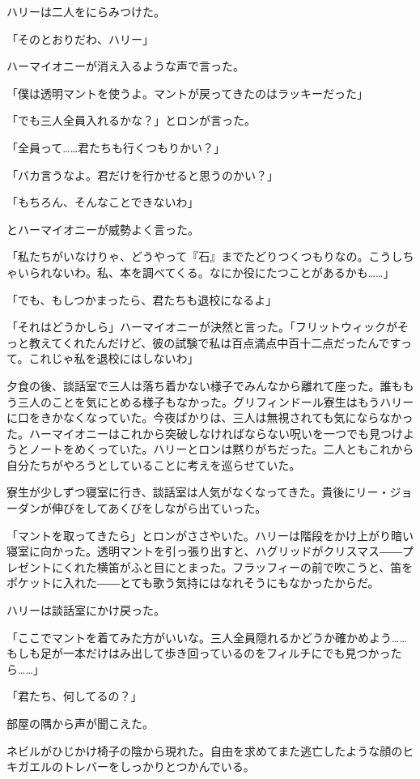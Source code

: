 \documentclass[10pt,a4paper]{article}
\begin{document}
\begin{CJK}{UTF8}{min}
ハリーは二人をにらみつけた。

「そのとおりだわ、ハリー」

ハーマイオニーが消え入るような声で言った。

「僕は透明マントを使うよ。マントが戻ってきたのはラッキーだった」

「でも三人全員入れるかな？」とロンが言った。

「全員って……君たちも行くつもりかい？」

「バカ言うなよ。君だけを行かせると思うのかい？」

「もちろん、そんなことできないわ」

とハーマイオニーが威勢よく言った。

「私たちがいなけりゃ、どうやって『石』までたどりつくつもりなの。こうしちゃいられないわ。私、本を調べてくる。なにか役にたつことがあるかも……」

「でも、もしつかまったら、君たちも退校になるよ」

「それはどうかしら」ハーマイオニーが決然と言った。「フリットウィックがそっと教えてくれたんだけど、彼の試験で私は百点満点中百十二点だったんですって。これじゃ私を退校にはしないわ」



夕食の後、談話室で三人は落ち着かない様子でみんなから離れて座った。誰ももう三人のことを気にとめる様子もなかった。グリフィンドール寮生はもうハリーに口をきかなくなっていた。今夜ばかりは、三人は無視されても気にならなかった。ハーマイオニーはこれから突破しなければならない呪いを一つでも見つけようとノートをめくっていた。ハリーとロンは黙りがちだった。二人ともこれから自分たちがやろうとしていることに考えを巡らせていた。

寮生が少しずつ寝室に行き、談話室は人気がなくなってきた。貴後にリー・ジョーダンが伸びをしてあくびをしながら出ていった。

「マントを取ってきたら」とロンがささやいた。ハリーは階段をかけ上がり暗い寝室に向かった。透明マントを引っ張り出すと、ハグリッドがクリスマス――プレゼントにくれた横笛がふと目にとまった。フラッフィーの前で吹こうと、笛をポケットに入れた――とても歌う気持にはなれそうにもなかったからだ。

ハリーは談話室にかけ戻った。

「ここでマントを着てみた方がいいな。三人全員隠れるかどうか確かめよう……もしも足が一本だけはみ出して歩き回っているのをフィルチにでも見つかったら……」

「君たち、何してるの？」

部屋の隅から声が聞こえた。

ネビルがひじかけ椅子の陰から現れた。自由を求めてまた逃亡したような顔のヒキガエルのトレバーをしっかりとつかんでいる。


\end{CJK}
\end{document}

